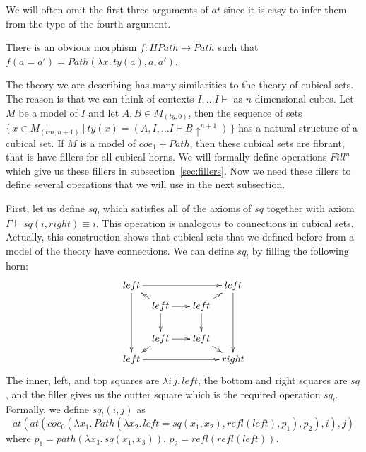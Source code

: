\documentclass[reqno]{amsart}
\theoremstyle{definition}
\theoremstyle{remark}
\newcommand{\deq}{\equiv}
\numberwithin{figure}{section}
\begin{document}
We will often omit the first three arguments of $at$ since it is easy to infer them from the type of the fourth argument.

There is an obvious morphism $f : HPath \to Path$ such that $f(a = a') = Path(\lambda x.\,ty(a), a, a')$.

The theory we are describing has many similarities to the theory of cubical sets.
The reason is that we can think of contexts $I, \ldots I \vdash$ as $n$-dimensional cubes.
Let $M$ be a model of $I$ and let $A,B \in M_{(ty,0)}$, then the sequence of sets
$\{\,x \in M_{(tm,n+1)}\ |\ ty(x) = (A, I, \ldots I \vdash B\!\uparrow^{n+1})\,\}$ has a natural structure of a cubical set.
If $M$ is a model of $coe_1 + Path$, then these cubical sets are fibrant, that is have fillers for all cubical horns.
We will formally define operations $Fill^n$ which give us these fillers in subsection~\ref{sec:fillers}.
Now we need these fillers to define several operations that we will use in the next subsection.

First, let us define $sq_l$ which satisfies all of the axioms of $sq$ together with axiom $\Gamma \vdash sq(i,right) \deq i$.
This operation is analogous to connections in cubical sets.
Actually, this construction shows that cubical sets that we defined before from a model of the theory have connections.
We can define $sq_l$ by filling the following horn:
\[ \xymatrix @C=0.5pc @R=0.5pc
    { left \ar[rrrr] \ar[dddd] &          & &                      & left \ar[dddd] \\
           & left \ar[rr] \ar[dd] \ar[ul] & & left \ar[dd] \ar[ur] & \\
           &                              & &                      & \\
           & left \ar[rr] \ar[dl]         & & left \ar[dr]         & \\
      left \ar[rrrr]           &          & &                      & right
    }\]
The inner, left, and top squares are $\lambda i\,j.\,left$, the bottom and right squares are $sq$,
and the filler gives us the outter square which is the required operation $sq_l$.
Formally, we define $sq_l(i,j)$ as
\[ at(at(coe_0(\lambda x_1.\,Path(\lambda x_2.\,left = sq(x_1,x_2), refl(left), p_1), p_2),i),j) \]
where $p_1 = path(\lambda x_3.\,sq(x_1,x_3))$, $p_2 = refl(refl(left))$.
\end{document}
